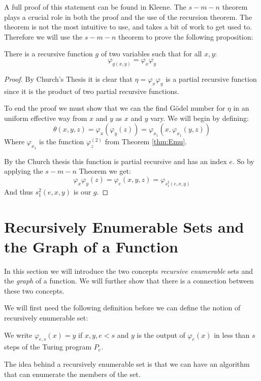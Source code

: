\documentclass[../main.tex]{subfiles}
\begin{document}
A full proof of this statement can be found in Kleene. The $s-m-n$ theorem
plays a crucial role in both the proof and the use of the recursion theorem.
The theorem is not the most intuitive to use, and takes a bit of work to get
used to. Therefore we will use the $s-m-n$ theorem to
prove the following proposition:
\begin{prop}
	There is a recursive function $g$ of two variables such that for all
	$x,y$:
\[\varphi_{g(x,y)}=\varphi_x\varphi_y\]
\end{prop}
\begin{proof}
	By Church's Thesis it is clear that $\eta=\varphi_x\varphi_y$ is a
	partial recursive function since it is the product of two partial
	recursive functions.

	To end the proof we must show that we can the find Gödel number for $\eta$
	in an uniform effective way from $x$ and $y$ as $x$ and $y$ vary. We
	will begin by defining:
	\[\theta(x,y,z)=\varphi_x(\varphi_y(z))=\varphi_{x_1}(x,\varphi_{x_1}(y,z))\]
	Where $\varphi_{x_1}$ is the function $\varphi_z^{(2)}$ from Theorem
	\ref{thm:Emu}.

	By the Church thesis this function is partial recursive
	and has an index $e$. So by applying the $s-m-n$ Theorem we get:
	\[\varphi_x\varphi_y(z)=
	\varphi_e(x,y,z)=\varphi_{s_1^2(e,x,y)}\]
	And thus $s_1^2(e,x,y)$ is our $g$.
\end{proof}

\section{Recursively Enumerable Sets and the Graph of a Function}
In this section we will introduce the two concepts \textit{recursive
enumerable} sets and the \textit{graph} of a function. We will further show
that there is a connection between these two concepts.

We will first need the following definition before we can define the notion of
recursively enumerable set:

\begin{defi}
	We write $\varphi_{e,s}(x)=y$ if $x,y,e<s$ and $y$ is the output of
	$\varphi_e(x)$ in less than $s$ steps of the Turing program $P_e$.
\end{defi}

The idea behind a recursively enumerable set is that we can have an algorithm
that can enumerate the members of the set.
\end{document}
